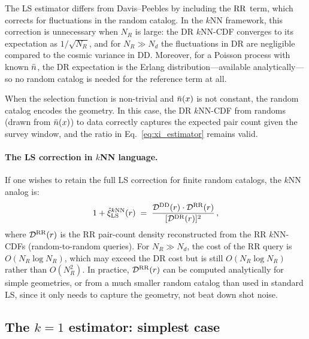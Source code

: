 The LS estimator differs from Davis--Peebles by including the $\mathrm{RR}$ term, which corrects for fluctuations in the random catalog.  In the $k$NN framework, this correction is unnecessary when $N_R$ is large: the DR $k$NN-CDF converges to its expectation as $1/\sqrt{N_R}$, and for $N_R \gg N_d$ the fluctuations in DR are negligible compared to the cosmic variance in DD.  Moreover, for a Poisson process with known $\bar{n}$, the DR expectation is the Erlang distribution---available analytically---so no random catalog is needed for the reference term at all.

When the selection function is non-trivial and $\bar{n}(x)$ is not constant, the random catalog encodes the geometry.  In this case, the DR $k$NN-CDF from randoms (drawn from $\bar{n}(x)$) to data correctly captures the expected pair count given the survey window, and the ratio in Eq.~\eqref{eq:xi_estimator} remains valid.

\paragraph{The LS correction in $k$NN language.}  If one wishes to retain the full LS correction for finite random catalogs, the $k$NN analog is:
\begin{equation}
  1 + \hat{\xi}_{\mathrm{LS}}^{k\mathrm{NN}}(r) \;=\; \frac{\mathcal{D}^{\mathrm{DD}}(r) \cdot \mathcal{D}^{\mathrm{RR}}(r)}{[\mathcal{D}^{\mathrm{DR}}(r)]^2}\,,
  \label{eq:xi_LS_knn}
\end{equation}
where $\mathcal{D}^{\mathrm{RR}}(r)$ is the RR pair-count density reconstructed from the RR $k$NN-CDFs (random-to-random queries).  For $N_R \gg N_d$, the cost of the RR query is $O(N_R \log N_R)$, which may exceed the DR cost but is still $O(N_R \log N_R)$ rather than $O(N_R^2)$.  In practice, $\mathcal{D}^{\mathrm{RR}}(r)$ can be computed analytically for simple geometries, or from a much smaller random catalog than used in standard LS, since it only needs to capture the geometry, not beat down shot noise.

\subsection{The $k = 1$ estimator: simplest case}
\label{sec:k1}

